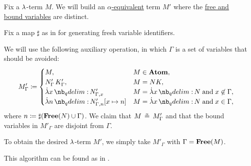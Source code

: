 \begin{algorithm}\label{alg:separation_of_free_and_bound_variables}
  Fix a \( {\mathrm \lambda} \)-term \( M \). We will build an \hyperref[def:lambda_term_alpha_equivalence]{\( \alpha \)-equivalent} term \( M' \) where the \hyperref[def:lambda_variable_freeness]{free and bound variables} are distinct.

  Fix a map \( \sharp \) as in  for generating fresh variable identifiers.

  We will use the following auxiliary operation, in which \( \Gamma \) is a set of variables that should be avoided:
  \begin{equation*}
    M'_\Gamma \coloneqq \begin{cases}
      M,                                 &M \in \op*{Atom}, \\
      N'_\Gamma \thinspace K'_\Gamma,    &M = NK, \\
      \qabs x N'_{\Gamma,x}              &M = \qabs x N \T{and} x \not\in \Gamma, \\
      \qabs n N'_{\Gamma,n}[x \mapsto n] &M = \qabs x N \T{and} x \in \Gamma,
    \end{cases}
  \end{equation*}
  where \( n \coloneqq \sharp(\op*{Free}(N) \cup \Gamma) \). We claim that \( M \aequiv M'_\Gamma \) and that the bound variables in \( M'_\Gamma \) are disjoint from \( \Gamma \).

  To obtain the desired \( {\mathrm \lambda} \)-term \( M' \), we simply take \( M'_\Gamma \) with \( \Gamma = \op*{Free}(M) \).
\end{algorithm}
\begin{comments}
  \item This algorithm can be found as  in \cite{notebook:code}.
\end{comments}
